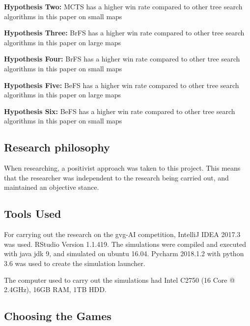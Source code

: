 \documentclass[journal]{IEEEtran}
\begin{document}
	\textbf{Hypothesis Two:}
		MCTS has a higher win rate compared to other tree search algorithms in this paper on small maps

	\textbf{Hypothesis Three:}
		BrFS has a higher win rate compared to other tree search algorithms in this paper on large maps

	\textbf{Hypothesis Four:}
		BrFS has a higher win rate compared to other tree search algorithms in this paper on small maps
		
	\textbf{Hypothesis Five:}
		BeFS has a higher win rate compared to other tree search algorithms in this paper on large maps
		
	\textbf{Hypothesis Six:}
		BeFS has a higher win rate compared to other tree search algorithms in this paper on small maps


\subsection{Research philosophy}
	When researching, a positivist approach \cite{scientific-method, crossan2003research} was taken to this project. 
	This means that the researcher was independent to the research being carried out, and maintained an objective stance.
	
	





	\subsection{Tools Used}
	For carrying out the research on the gvg-AI competition, IntelliJ IDEA 2017.3 was used. RStudio Version 1.1.419. The simulations were compiled and executed with java jdk 9, and simulated on ubuntu 16.04.
	Pycharm 2018.1.2 with python 3.6 was used to create the simulation launcher.
	
	The computer used to carry out the simulations had Intel C2750 (16 Core @ 2.4GHz), 16GB RAM, 1TB HDD.

	\subsection{Choosing the Games}
	
\end{document}
